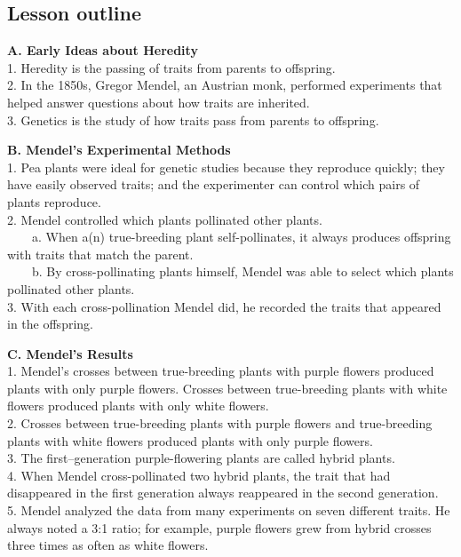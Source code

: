 \documentclass[
]{book}
\begin{document}
\hypertarget{lesson-outline-5}{%
\subsection{Lesson outline}\label{lesson-outline-5}}

\textbf{A. Early Ideas about Heredity}\\
1. {Heredity} is the passing of traits from parents to offspring.\\
2. In the 1850s, {Gregor Mendel}, an Austrian monk, performed experiments that helped answer questions about how traits are inherited.\\
3. {Genetics} is the study of how traits pass from parents to offspring.

\textbf{B. Mendel's Experimental Methods}\\
1. Pea plants were ideal for genetic studies because they {reproduce} quickly; they have easily observed {traits}; and the experimenter can control which pairs of plants {reproduce}.\\
2. Mendel controlled which plants {pollinated} other plants.\\
    a. When a(n) {true-breeding} plant self-pollinates, it always produces offspring with traits that match the parent.\\
    b. By {cross-pollinating} plants himself, Mendel was able to select which plants pollinated other plants.\\
3. With each cross-pollination Mendel did, he recorded the traits that appeared in the {offspring}.

\textbf{C. Mendel's Results}\\
1. Mendel's crosses between true-breeding plants with purple flowers produced plants with only {purple} flowers. Crosses between true-breeding plants with white flowers produced plants with only {white} flowers.\\
2. Crosses between true-breeding plants with purple flowers and true-breeding plants with white flowers produced plants with only {purple} flowers.\\
3. The first--generation purple-flowering plants are called {hybrid} plants.\\
4. When Mendel cross-pollinated two hybrid plants, the trait that had disappeared in the first generation always {reappeared} in the second generation.\\
5. Mendel analyzed the data from many experiments on seven different {traits}. He always noted a 3:1 {ratio}; for example, purple flowers grew from hybrid crosses {three} times as often as white flowers.
\end{document}
